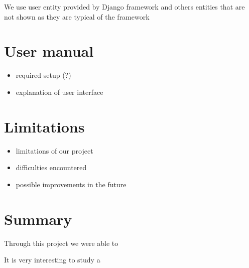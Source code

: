 \documentclass{article}
\begin{document}
We use user entity provided by Django framework and others entities that are not shown as they are typical of the framework
\section{User manual}
\begin{itemize}
\item required setup (?)
\item explanation of user interface
\end{itemize}
\newpage

\section{Limitations}
\begin{itemize}
\item limitations of our project
\item difficulties encountered
\item possible improvements in the future
\end{itemize}

\section{Summary}
Through this project we were able to

It is very interesting to study a 
\end{document}
